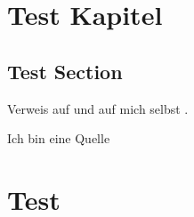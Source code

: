\documentclass[
    load-preamble = true,
    load-dhbw-templates,
    add-bibliography,
    add-tocs-to-toc,
    debug,
    ngerman
]{iodhbwm}
\begin{document}
    
    \dhbwtitlepage
    
    \dhbwdeclaration
    
    \tableofcontents
    \listoffigures
    \listoftables
    
    \chapter{Test Kapitel}\label{chap:test-chap}
        \section{Test Section}\label{sec:test-sec}
            \blindtext
            
            Verweis auf  und auf mich selbst .
            
            \lipsum
            
            Ich bin eine Quelle \cite{Helmke2007}
    \chapter{Test}
\end{document}

